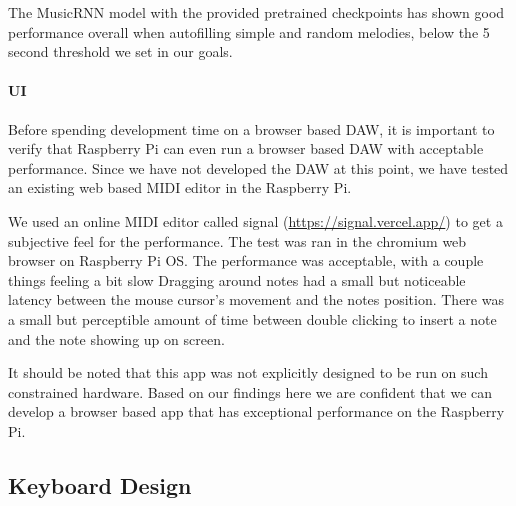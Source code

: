 The MusicRNN model with the provided pretrained checkpoints has shown good performance
overall when autofilling simple and random melodies, below the 5 second threshold we set
in our goals.

\paragraph{UI} Before spending development time on a browser based DAW, it is important to
verify that Raspberry Pi can even run a browser based DAW with acceptable performance.
Since we have not developed the DAW at this point, we have tested an existing web based
MIDI editor in the Raspberry Pi.

We used an online MIDI editor called signal (\url{https://signal.vercel.app/}) to get a
subjective feel for the performance. The test was ran in the chromium web browser on
Raspberry Pi OS. The performance was acceptable, with a couple things feeling a bit slow
Dragging around notes had a small but noticeable latency between the mouse cursor's
movement and the notes position. There was a small but perceptible amount of time between
double clicking to insert a note and the note showing up on screen.

It should be noted that this app was not explicitly designed to be run on such constrained
hardware. Based on our findings here we are confident that we can develop a browser based
app that has exceptional performance on the Raspberry Pi.


\subsection{Keyboard Design}
